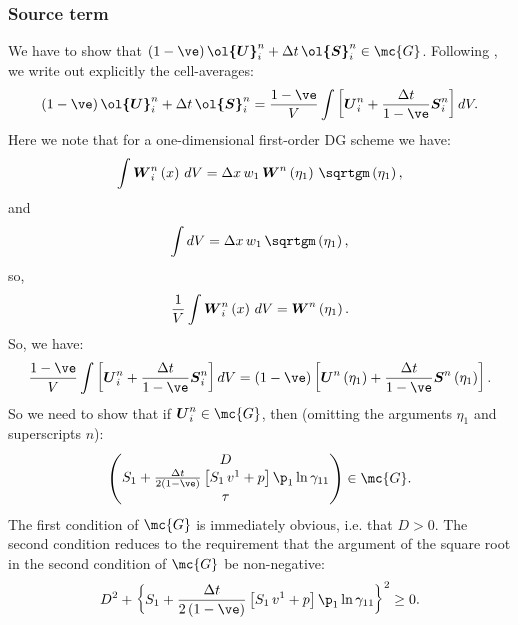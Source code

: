 \documentclass[10pt,preprint]{aastex}
\begin{document}
\subsubsection{Source term}
We have to show that $\left(1-\ve\right)\vect{\ol{U}}^{n}_{i}+\Delta t\,\vect{\ol{S}}^{n}_{i}\in\mc{G}$. Following \citet{ZS2011b}, we write out explicitly the cell-averages:
\begin{equation*}
    \left(1-\ve\right)\vect{\ol{U}}^{n}_{i}+\Delta t\,\vect{\ol{S}}^{n}_{i}=\f{1-\ve}{V}\int\left[\vect{U}^{n}_{i}+\f{\Delta t}{1-\ve}\vect{S}^{n}_{i}\right]dV.
\end{equation*}
Here we note that for a one-dimensional first-order DG scheme we have:
\begin{equation*}
    \int\vect{W}^{n}_{i}\left(x\right)\,dV=\Delta x\,w_{1}\,\vect{W}^{n}\left(\eta_{1}\right)\,\sqrtgm\left(\eta_{1}\right),
\end{equation*}
and
\begin{equation*}
    \int dV=\Delta x\,w_{1}\,\sqrtgm\left(\eta_{1}\right),
\end{equation*}
so,
\begin{equation*}
    \frac{1}{V}\int\boldsymbol{W}^{n}_{i}\left(x\right)\,dV=\boldsymbol{W}^{n}\left(\eta_{1}\right).
\end{equation*}
So, we have:
\begin{equation*}
    \f{1-\ve}{V}\int\left[\vect{U}^{n}_{i}+\f{\Delta t}{1-\ve}\vect{S}^{n}_{i}\right]dV=\left(1-\ve\right)\left[\vect{U}^{n}\left(\eta_{1}\right)+\f{\Delta t}{1-\ve}\vect{S}^{n}\left(\eta_{1}\right)\right].
\end{equation*}
So we need to show that if $\vect{U}^{n}_{i}\in\mc{G}$, then (omitting the arguments $\eta_{1}$ and superscripts $n$):
\begin{equation*}
    \begin{pmatrix}D\\ S_{1}+\f{\Delta t}{2\left(1-\ve\right)}\left[S_{1}\,v^{1}+p\right]\p_{1}\ln\gamma_{11}\\\tau\end{pmatrix}\in\mc{G}.
\end{equation*}
The first condition of $\mc{G}$ is immediately obvious, i.e. that $D>0$. The second condition reduces to the requirement that the argument of the square root in the second condition of $\mc{G}$ be non-negative:
\begin{equation*}
    D^{2}+\left\{S_{1}+\f{\Delta t}{2\left(1-\ve\right)}\left[S_{1}\,v^{1}+p\right]\p_{1}\ln\gamma_{11}\right\}^{2}\geq0.
\end{equation*}
\end{document}
